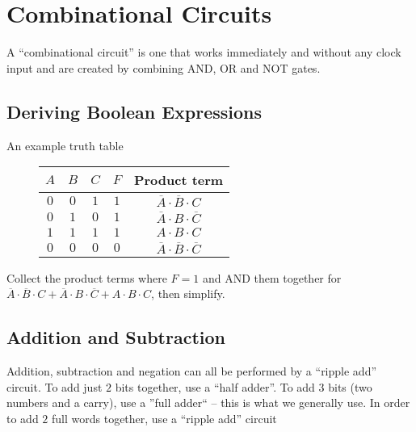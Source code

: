 \section{Combinational Circuits}\label{sec:combinational_circuits}

A ``combinational circuit'' is one that works immediately and without any clock input and are created by combining AND, OR and NOT gates.

\subsection{Deriving Boolean Expressions}\label{sub:deriving_boolean_expressions}

\begin{highlight}{An example truth table}
    \begin{figure}[H]
        \centering
        \begin{tabular}{ccc|c|c}
            \toprule
            \(A\) & \(B\) & \(C\) & \(F\) & Product term                                         \\
            \midrule
            \(0\) & \(0\) & \(1\) & \(1\) & \(\overline{A}\cdot \overline{B}\cdot C\)            \\
            \(0\) & \(1\) & \(0\) & \(1\) & \(\overline{A}\cdot B\cdot \overline{C}\)            \\
            \(1\) & \(1\) & \(1\) & \(1\) & \(A\cdot B\cdot C\)                                  \\
            \(0\) & \(0\) & \(0\) & \(0\) & \(\overline{A}\cdot \overline{B}\cdot \overline{C}\) \\
        \end{tabular}
        \label{fig:example_truth_table}
    \end{figure}
\end{highlight}

\noindent
Collect the product terms where \(F=1\) and AND them together for \(\overline{A}\cdot \overline{B}\cdot C + \overline{A}\cdot B\cdot \overline{C} +A\cdot B\cdot C\), then simplify.

\subsection{Addition and Subtraction}\label{sub:addition_and_subtraction}

Addition, subtraction and negation can all be performed by a ``ripple add'' circuit.
To add just \(2\) bits together, use a ``half adder''.
To add \(3\) bits (two numbers and a carry), use a ''full adder`` -- this is what we generally use.
In order to add \(2\) full words together, use a ``ripple add'' circuit

